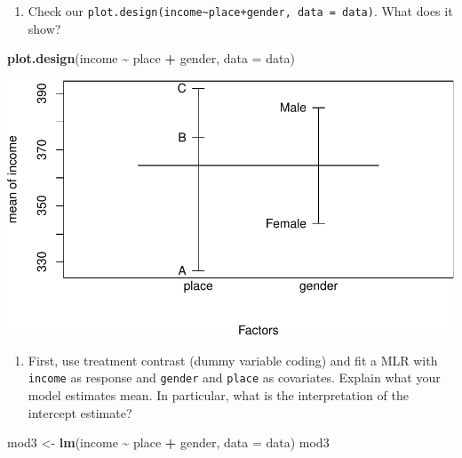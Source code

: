 \documentclass[
]{article}
\newenvironment{Shaded}{\begin{snugshade}}{\end{snugshade}}
\newcommand{\AttributeTok}[1]{\textcolor[rgb]{0.13,0.29,0.53}{#1}}
\newcommand{\FunctionTok}[1]{\textcolor[rgb]{0.13,0.29,0.53}{\textbf{#1}}}
\newcommand{\NormalTok}[1]{#1}
\newcommand{\OtherTok}[1]{\textcolor[rgb]{0.56,0.35,0.01}{#1}}
\newcommand{\SpecialCharTok}[1]{\textcolor[rgb]{0.81,0.36,0.00}{\textbf{#1}}}
\providecommand{\tightlist}{%
  \setlength{\itemsep}{0pt}\setlength{\parskip}{0pt}}
\begin{document}
\begin{enumerate}
\def\labelenumi{\arabic{enumi}.}
\setcounter{enumi}{2}
\tightlist
\item
  Check our
  \texttt{plot.design(income\textasciitilde{}place+gender,\ data\ =\ data)}.
  What does it show?
\end{enumerate}

\begin{Shaded}
\begin{Highlighting}[]
\FunctionTok{plot.design}\NormalTok{(income }\SpecialCharTok{\textasciitilde{}}\NormalTok{ place }\SpecialCharTok{+}\NormalTok{ gender, }\AttributeTok{data =}\NormalTok{ data)}
\end{Highlighting}
\end{Shaded}

\includegraphics{2MLR_files/figure-latex/unnamed-chunk-31-1.pdf}

\begin{enumerate}
\def\labelenumi{\arabic{enumi}.}
\setcounter{enumi}{3}
\tightlist
\item
  First, use treatment contrast (dummy variable coding) and fit a MLR
  with \texttt{income} as response and \texttt{gender} and
  \texttt{place} as covariates. Explain what your model estimates mean.
  In particular, what is the interpretation of the intercept estimate?
\end{enumerate}

\begin{Shaded}
\begin{Highlighting}[]
\NormalTok{mod3 }\OtherTok{\textless{}{-}} \FunctionTok{lm}\NormalTok{(income }\SpecialCharTok{\textasciitilde{}}\NormalTok{ place }\SpecialCharTok{+}\NormalTok{ gender, }\AttributeTok{data =}\NormalTok{ data)}
\NormalTok{mod3}
\end{Highlighting}
\end{Shaded}
\end{document}
